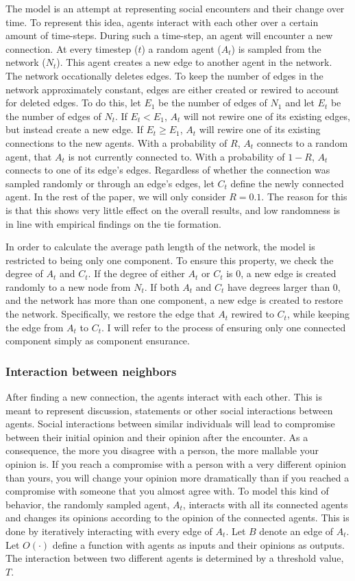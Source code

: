 \documentclass{article}
\begin{document}
The model is an attempt at representing social encounters and their change over time. 
To represent this idea, agents interact with each other over a certain amount of time-steps. 
During such a time-step, an agent will encounter a new connection. 
At every timestep ($t$) a random agent ($A_t$) is sampled from the network ($N_t$). This agent creates a new edge to another agent in the network. The network occationally deletes edges.
To keep the number of edges in the network approximately constant, edges are either created or rewired to account for deleted edges. 
To do this, let $E_1$ be the number of edges of $N_1$ and let $E_t$ be the number of edges of $N_t$. 
If $E_t < E_1$, $A_t$ will not rewire one of its existing edges, but instead create a new edge. If $E_t \geq E_1$, $A_t$ will rewire one of its existing connections to the new agents.
With a probability of $R$, $A_t$ connects to a random agent, that $A_t$ is not currently connected to. 
With a probability of $1-R$, $A_t$ connects to one of its edge's edges. Regardless of whether the connection was sampled randomly or through an edge's edges, let $C_t$ define the newly connected agent.
In the rest of the paper, we will only consider $R=0.1$. The reason for this is that this shows very little effect on the overall results, and low randomness is in line with empirical findings on the tie formation.

In order to calculate the average path length of the network, the model is restricted to being only one component. 
To ensure this property, we check the degree of $A_t$ and $C_t$. If the degree of either $A_t$ or $C_t$ is 0, a new edge is created randomly to a new node from $N_t$.
If both $A_t$ and $C_t$ have degrees larger than 0, and the network has more than one component, a new edge is created to restore the network. Specifically, we restore the edge that $A_t$ rewired to $C_t$, while keeping the edge from $A_t$ to $C_t$.
I will refer to the process of ensuring only one connected component simply as component ensurance. 

\subsubsection{Interaction between neighbors}
After finding a new connection, the agents interact with each other. This is meant to represent 
discussion, statements or other social interactions between agents. 
Social interactions between similar individuals will lead to compromise between their initial opinion and their opinion after the encounter.
As a consequence, the more you disagree with a person, the more mallable your opinion is. If you reach a compromise with a person with a very different opinion than yours,
you will change your opinion more dramatically than if you reached a compromise with someone that you almost agree with. 
To model this kind of behavior, the randomly sampled agent, $A_t$, interacts with all its connected agents and changes its opinions according to the opinion of the connected agents.
This is done by iteratively interacting with every edge of $A_t$. Let $B$ denote an edge of $A_t$. Let $O(\cdot)$ define a function with agents as inputs and their opinions as outputs.
The interaction between two different agents is determined by a threshold value, $T$. 
\end{document}

